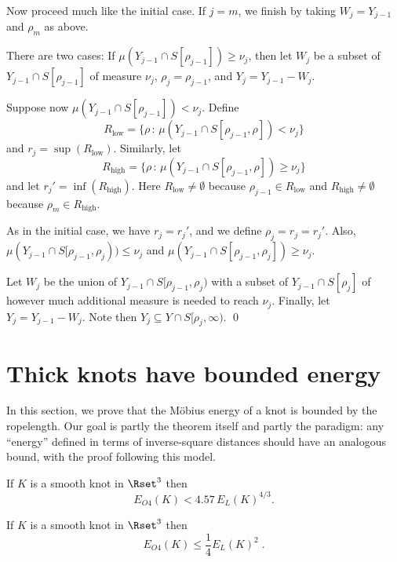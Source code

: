 \documentclass{elsart}
\def\E{E}
\begin{document}
\begin{pf}
Now proceed much like the initial case.
If $j=m$, we finish by taking $W_j=Y_{j-1}$ and $\rho_m$ as above.

There are two cases: If $\mu(Y_{j-1}\cap S[\rho_{j-1}])\geq \nu_j$, then
let $W_j$ be a subset of $Y_{j-1}\cap S[\rho_{j-1}]$ of measure
$\nu_j$, $\rho_j=\rho_{j-1}$, and $Y_j=Y_{j-1}-W_j$.

Suppose now $\mu(Y_{j-1}\cap S[\rho_{j-1}])<\nu_j$.  Define
$$R_{\text{low}}=\{\rho\,:\,\mu(Y_{j-1}\cap S[\rho_{j-1},\rho])<\nu_j\}$$
and $r_j=\sup(R_{\text{low}})$.
Similarly, let
$$R_{\text{high}}=\{\rho\,:\,\mu(Y_{j-1}\cap S[\rho_{j-1},\rho])\geq \nu_j\}$$
and let $r_j'=\inf(R_{\text{high}})$.
Here $R_{\text{low}}\not = \emptyset$ because $\rho_{j-1}\in R_{\text{low}}$ and
$R_{\text{high}}\not = \emptyset$ because $\rho_m\in R_{\text{high}}$.

As in the initial case, we have $r_j=r_j'$, and we define
$\rho_j=r_j=r_j'$.  Also, 
$\mu(Y_{j-1}\cap S[\rho_{j-1},\rho_j))\leq \nu_j$ and 
$\mu(Y_{j-1}\cap S[\rho_{j-1},\rho_j]) \geq \nu_j$.

Let $W_j$ be the union of $Y_{j-1}\cap S[\rho_{j-1},\rho_j)$ with
a subset of $Y_{j-1}\cap S[\rho_j]$ of however much additional
measure is needed to reach $\nu_j$.
Finally, let $Y_j=Y_{j-1}-W_j$.  Note then $Y_j\subseteq
Y\cap S[\rho_j,\infty)$.
\qed
\end{pf}

\section{Thick knots have bounded energy}

In this section, we prove that the M\"obius energy of a
knot is bounded by the ropelength.  Our goal is
partly the theorem itself and partly the paradigm:  any
``energy'' defined in terms of inverse-square distances
should have an analogous bound, with the proof following
this model.

\begin{thm} If $K$ is a smooth knot in $\Rset^3$ then  
\begin{equation}
\E_{O4}(K) < 4.57\, \E_L(K)^{4/3}.
\label{powbound}
\end{equation}
\label{main}
\end{thm}

\begin{thm} If $K$ is a smooth knot in $\Rset^3$ then 
\begin{equation}
\E_{O4}(K) \leq \frac{1}{4}\E_L(K)^2 \;.
\label{quadbound}
\end{equation}
\label{quadboundthm}
\end{thm}
\end{document}
